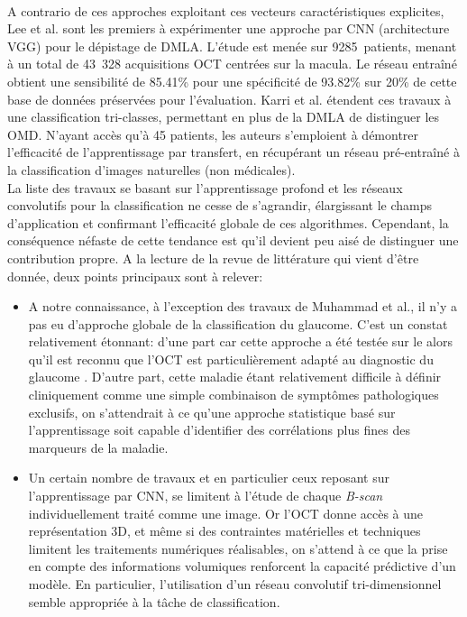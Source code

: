 \\
A contrario de ces approches exploitant ces vecteurs caractéristiques explicites, Lee et al.\cite{leeDeepLearningEffective2017a} sont les premiers à expérimenter une approche par \ac{CNN} (architecture VGG) pour le dépistage de \ac{DMLA}. L'étude est menée sur \SI{9285}{patients}, menant à un total de 43~328 acquisitions OCT centrées sur la macula. Le réseau entraîné obtient une sensibilité de 85.41\% pour une spécificité de 93.82\% sur 20\% de cette base de données préservées pour l'évaluation. Karri et al.\cite{karriTransferLearningBased2017} étendent ces travaux à une classification tri-classes, permettant en plus de la \ac{DMLA} de distinguer les \ac{OMD}. N'ayant accès qu'à 45 patients, les auteurs s'emploient à démontrer l'efficacité de l'apprentissage par transfert, en récupérant un réseau pré-entraîné à la classification d'images naturelles (non médicales). \\
La liste des travaux se basant sur l'apprentissage profond et les réseaux convolutifs pour la classification ne cesse de s'agrandir, élargissant le champs d'application et confirmant l'efficacité globale de ces algorithmes. Cependant, la conséquence néfaste de cette tendance est qu'il devient peu aisé de distinguer une contribution propre. A la lecture de la revue de littérature qui vient d'être donnée, deux points principaux sont à relever:
\begin{itemize}
	\item A notre connaissance, à l'exception des travaux de Muhammad et al.\cite{muhammadHybridDeepLearning2017}, il n'y a pas eu d'approche globale de la classification du glaucome. C'est un constat relativement étonnant: d'une part car cette approche a été testée sur le \fundus{} alors qu'il est reconnu que l'\ac{OCT} est particulièrement adapté au diagnostic du glaucome \cite{jaffeOpticalCoherenceTomography2004}. D'autre part, cette maladie étant relativement difficile à définir cliniquement comme une simple combinaison de symptômes pathologiques exclusifs, on s'attendrait à ce qu'une approche statistique basé sur l'apprentissage soit capable d'identifier des corrélations plus fines des marqueurs de la maladie. 
	\item Un certain nombre de travaux et en particulier ceux reposant sur l'apprentissage par \ac{CNN}, se limitent à l'étude de chaque \textit{B-scan} individuellement traité comme une image. Or l'\ac{OCT} donne accès à une représentation 3D, et même si des contraintes matérielles et techniques limitent les traitements numériques réalisables, on s'attend à ce que la prise en compte des informations volumiques renforcent la capacité prédictive d'un modèle. En particulier, l'utilisation d'un réseau convolutif tri-dimensionnel semble appropriée à la tâche de classification. 
\end{itemize}

